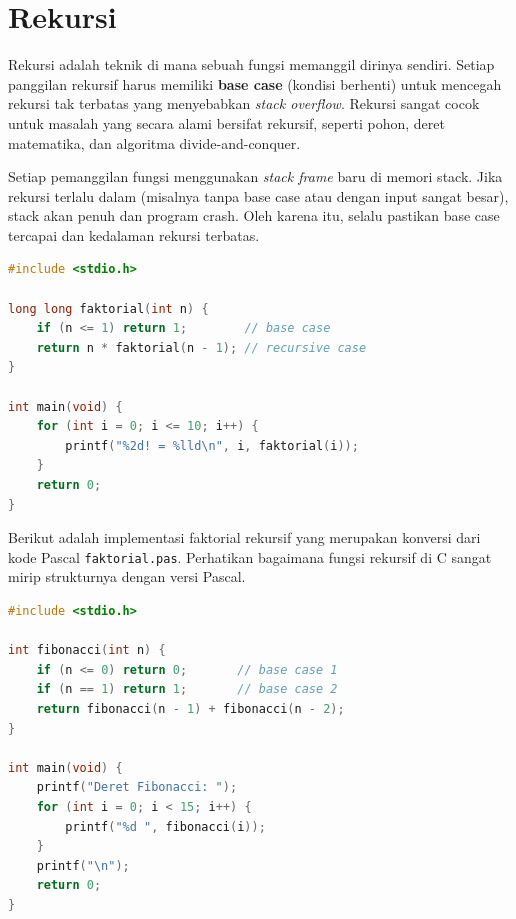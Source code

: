 \documentclass[../main.tex]{subfiles}
\begin{document}
\section{Rekursi}

Rekursi adalah teknik di mana sebuah fungsi memanggil dirinya sendiri. Setiap panggilan rekursif harus memiliki \textbf{base case} (kondisi berhenti) untuk mencegah rekursi tak terbatas yang menyebabkan \textit{stack overflow}. Rekursi sangat cocok untuk masalah yang secara alami bersifat rekursif, seperti pohon, deret matematika, dan algoritma divide-and-conquer.

Setiap pemanggilan fungsi menggunakan \textit{stack frame} baru di memori stack. Jika rekursi terlalu dalam (misalnya tanpa base case atau dengan input sangat besar), stack akan penuh dan program crash. Oleh karena itu, selalu pastikan base case tercapai dan kedalaman rekursi terbatas.

\begin{lstlisting}[language=C,caption=Faktorial rekursif]
#include <stdio.h>

long long faktorial(int n) {
    if (n <= 1) return 1;        // base case
    return n * faktorial(n - 1); // recursive case
}

int main(void) {
    for (int i = 0; i <= 10; i++) {
        printf("%2d! = %lld\n", i, faktorial(i));
    }
    return 0;
}
\end{lstlisting}

Berikut adalah implementasi faktorial rekursif yang merupakan konversi dari kode Pascal \texttt{faktorial.pas}. Perhatikan bagaimana fungsi rekursif di C sangat mirip strukturnya dengan versi Pascal.



\begin{lstlisting}[language=C,caption=Fibonacci rekursif]
#include <stdio.h>

int fibonacci(int n) {
    if (n <= 0) return 0;       // base case 1
    if (n == 1) return 1;       // base case 2
    return fibonacci(n - 1) + fibonacci(n - 2);
}

int main(void) {
    printf("Deret Fibonacci: ");
    for (int i = 0; i < 15; i++) {
        printf("%d ", fibonacci(i));
    }
    printf("\n");
    return 0;
}
\end{lstlisting}
\end{document}
